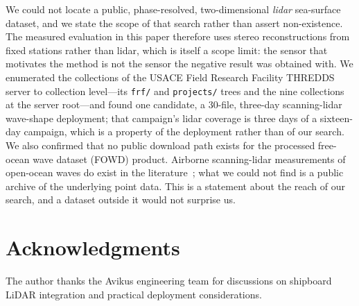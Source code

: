 \documentclass[review]{elsarticle}
\begin{document}
We could not locate a public, phase-resolved, two-dimensional \emph{lidar}
sea-surface dataset, and we state the scope of that search rather than assert
non-existence. The measured evaluation in this paper therefore uses stereo
reconstructions from fixed stations rather than lidar, which is itself a scope
limit: the sensor that motivates the method is not the sensor the negative result
was obtained with.  We
enumerated the collections of the USACE Field Research Facility THREDDS
server to collection level---its \texttt{frf/} and \texttt{projects/}
trees and the nine collections at the server root---and found one
candidate, a 30-file, three-day scanning-lidar wave-shape deployment;
that campaign's lidar coverage is three days of a sixteen-day campaign,
which is a property of the deployment rather than of our search.  We also
confirmed that no public download path exists for the processed
free-ocean wave dataset (FOWD) product.  Airborne scanning-lidar
measurements of open-ocean waves do exist in the
literature~\citep{hwang2000}; what we could not find is a public archive
of the underlying point data.  This is a statement about the reach of our
search, and a dataset outside it would not surprise us.

\section*{Acknowledgments}

The author thanks the Avikus engineering team for discussions on
shipboard LiDAR integration and practical deployment considerations.



\end{document}
